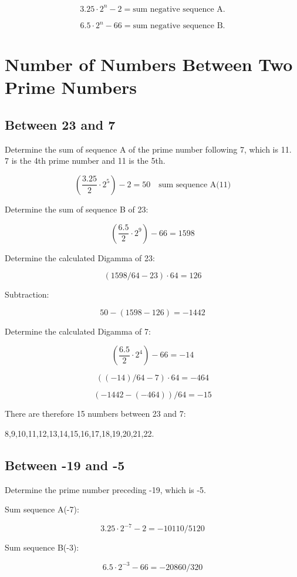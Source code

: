 \documentclass[a4paper,11pt]{article}
\begin{document}
\[
3.25 \cdot 2^{n} - 2 = \text{sum negative sequence A.}
\]

\[
6.5 \cdot 2^{n} - 66 = \text{sum negative sequence B.}
\]

\section*{Number of Numbers Between Two Prime Numbers}

\subsection*{Between 23 and 7}

Determine the sum of sequence A of the prime number following 7, which is 11.\\
7 is the 4th prime number and 11 is the 5th.

\[
\left(\frac{3.25}{2} \cdot 2^{5}\right) - 2 = 50 \quad \text{sum sequence A(11)}
\]

Determine the sum of sequence B of 23:

\[
\left(\frac{6.5}{2} \cdot 2^{9}\right) - 66 = 1598
\]

Determine the calculated Digamma of 23:

\[
(1598/64 - 23) \cdot 64 = 126
\]

Subtraction:

\[
50 - (1598 - 126) = -1442
\]

Determine the calculated Digamma of 7:

\[
\left(\frac{6.5}{2} \cdot 2^{4}\right) - 66 = -14
\]

\[
((-14)/64 - 7) \cdot 64 = -464
\]

\[
(-1442 - (-464))/64 = -15
\]

There are therefore 15 numbers between 23 and 7:

8,9,10,11,12,13,14,15,16,17,18,19,20,21,22.

\subsection*{Between -19 and -5}

Determine the prime number preceding -19, which is -5.

Sum sequence A(-7):

\[
3.25 \cdot 2^{-7} - 2 = -10110/5120
\]

Sum sequence B(-3):

\[
6.5 \cdot 2^{-3} - 66 = -20860/320
\]
\end{document}
